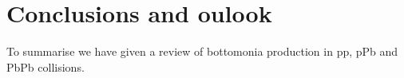 \section{Conclusions and oulook}
\label{sec:conclusions}
To summarise we have given a review of bottomonia production in
pp, pPb and PbPb collisions. 
